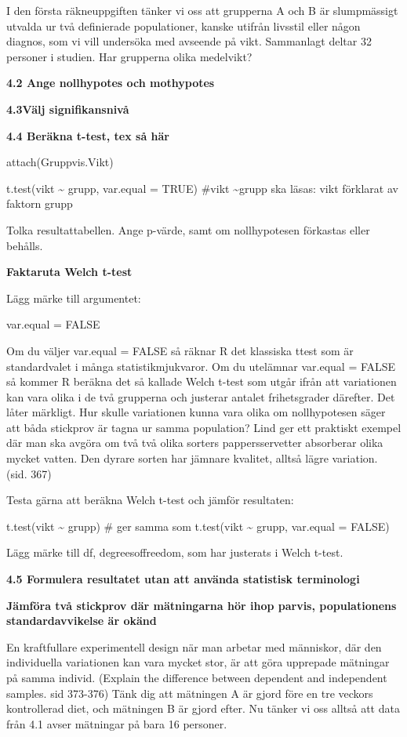 \documentclass[
  letterpaper,
  DIV=11,
  numbers=noendperiod]{scrartcl}
\begin{document}
I den första räkneuppgiften tänker vi oss att grupperna A och B är
slumpmässigt utvalda ur två definierade populationer, kanske utifrån
livsstil eller någon diagnos, som vi vill undersöka med avseende på
vikt. Sammanlagt deltar 32 personer i studien. Har grupperna olika
medelvikt?

\textbf{4.2 Ange nollhypotes och mothypotes}

\textbf{4.3Välj signifikansnivå}

\textbf{4.4 Beräkna t-test, tex så här}

attach(Gruppvis.Vikt)

t.test(vikt \textasciitilde{} grupp, var.equal = TRUE) \#vikt
\textasciitilde grupp ska läsas: vikt förklarat av faktorn grupp

Tolka resultattabellen. Ange p-värde, samt om nollhypotesen förkastas
eller behålls.

\textbf{Faktaruta Welch t-test}

Lägg märke till argumentet:

var.equal = FALSE

Om du väljer var.equal = FALSE så räknar R det klassiska ttest som är
standardvalet i många statistikmjukvaror. Om du utelämnar var.equal =
FALSE så kommer R beräkna det så kallade Welch t-test som utgår ifrån
att variationen kan vara olika i de två grupperna och justerar antalet
frihetsgrader därefter. Det låter märkligt. Hur skulle variationen kunna
vara olika om nollhypotesen säger att båda stickprov är tagna ur samma
population? Lind ger ett praktiskt exempel där man ska avgöra om två två
olika sorters pappersservetter absorberar olika mycket vatten. Den
dyrare sorten har jämnare kvalitet, alltså lägre variation. (sid. 367)

Testa gärna att beräkna Welch t-test och jämför resultaten:

t.test(vikt \textasciitilde{} grupp) \# ger samma som t.test(vikt
\textasciitilde{} grupp, var.equal = FALSE)

Lägg märke till df, degreesoffreedom, som har justerats i Welch t-test.

\textbf{4.5 Formulera resultatet utan att använda statistisk
terminologi}

\textbf{Jämföra två stickprov där mätningarna hör ihop parvis,
populationens standardavvikelse är okänd}

En kraftfullare experimentell design när man arbetar med människor, där
den individuella variationen kan vara mycket stor, är att göra upprepade
mätningar på samma individ. (Explain the difference between dependent
and independent samples. sid 373-376) Tänk dig att mätningen A är gjord
före en tre veckors kontrollerad diet, och mätningen B är gjord efter.
Nu tänker vi oss alltså att data från 4.1 avser mätningar på bara 16
personer.
\end{document}
